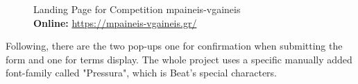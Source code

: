 \begin{figure}[H]
	\centering
	\qquad
	\caption{
		Landing Page for Competition mpaineis-vgaineis
		\\
		\textbf{Online: } \url{https://mpaineis-vgaineis.gr/}
	}
	\label{fig:example}
\end{figure}

Following, there are the two pop-ups one for confirmation when submitting the form and one for terms display. The whole project uses a specific manually added font-family called "Pressura", which is Beat's special characters. \par

